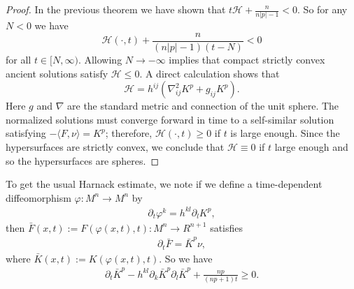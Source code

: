 \documentclass{amsart}
\theoremstyle{definition}
\theoremstyle{remark}
\numberwithin{equation}{section}
\begin{document}
\begin{proof}
In the previous theorem we have shown
that $t\mathcal{H}+\frac{n}{n |p| -1}<0$. So for any $N<0$ we have
\[\mathcal{H}(\cdot,t)+\frac{n}{(n |p| -1)(t-N)}<0\]
for all $t\in [N,\infty).$
Allowing $N\to -\infty$ implies that compact strictly convex ancient solutions satisfy $\mathcal{H}\leq 0.$ A direct calculation shows that
\[\mathcal{H}=h^{ij}(\nabla_{ij}^2K^p+g_{ij}K^{p}).\]
Here $g$ and $\nabla$ are the standard metric and connection of the unit sphere. The normalized solutions must converge forward in time to a self-similar solution satisfying $-\langle F,\nu \rangle=K^{p}$; therefore, $\mathcal{H}(\cdot,t)\geq 0$ if $t$ is large enough. Since the hypersurfaces are strictly convex, we conclude that  $\mathcal{H}\equiv 0$ if $t$ large enough and so the hypersurfaces are spheres.
\end{proof}
To get the usual Harnack estimate, we note if we define a time-dependent diffeomorphism $\varphi: M^n\to M^n$ by
\begin{align}
\partial_t\varphi^k=h^{kl}\partial_l K^{ p },
\end{align}
then $\bar{F}(x,t):=F(\varphi(x,t),t):M^{n}\to R^{n+1}$ satisfies
\begin{align}
\partial_t\bar{F}=\bar{K}^{ p }\nu,
\end{align}
where $\bar{K}(x,t):=K(\varphi(x,t),t)$. So we have
\begin{align}
\partial_t\bar{K}^{ p }-h^{kl}\partial_k\bar{K}^{ p }\partial_l\bar{K}^{ p }+\frac{n p }{(n p +1)t}\geq 0.
\end{align}



\end{document}
